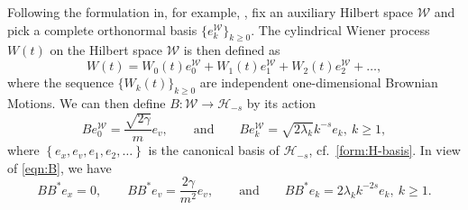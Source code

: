 \documentclass[11pt]{amsart}
\theoremstyle{definition}
\newcommand{\W}{\mathcal{W}}
\renewcommand{\H}{\mathcal{H}}
\theoremstyle{definition}
\theoremstyle{plain}
\numberwithin{equation}{section}
\begin{document}
Following the formulation in, for example, \cite{da2014stochastic}, fix an auxiliary Hilbert space $\W$ and pick a complete orthonormal basis $\{e_k^{\W}\}_{k\geq 0}$. The cylindrical Wiener process $W(t)$ on the Hilbert space $\W$ is then defined as
\begin{equation}\label{eqn:Wiener}
W(t)=W_0(t)e^{\W}_0+W_1(t)e^{\W}_1+W_2(t)e^{\W}_2+\dots,
\end{equation}
where the sequence $\{W_k(t)\}_{k\geq 0}$ are independent one-dimensional Brownian Motions. We can then define $B:\W\to\H_{-s}$ by its action
\begin{equation} \label{eqn:B}
Be^{\W}_0=\frac{\sqrt{2\gamma}}{m}e_v,\qquad\text{and}\qquad Be^{\W}_k=\sqrt{2\lambda_k}k^{-s}e_k,\ k\geq 1,
\end{equation}
where $\left\{e_x,e_v,e_1,e_2,\dots\right\}$ is the canonical basis of $\H_{-s}$, cf.~\eqref{form:H-basis}. In view of \eqref{eqn:B}, we have
\begin{equation} \label{eqn:density-4}
BB^*e_x=0,\qquad BB^*e_v=\frac{2\gamma}{m^2}e_v,\qquad\text{and}\qquad BB^*e_k=2\lambda_k k^{-2s}e_k,\ k\geq 1.
\end{equation}
\end{document}
